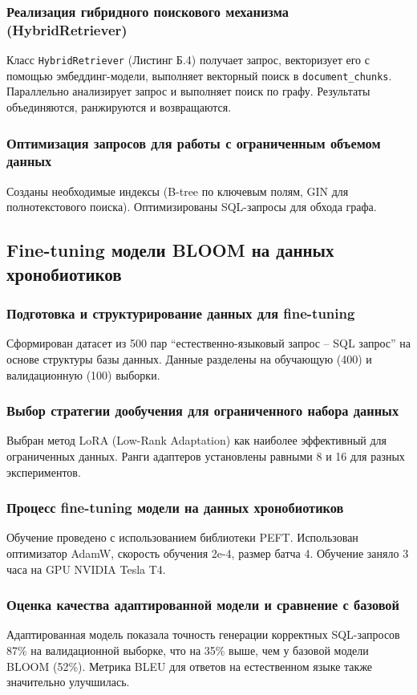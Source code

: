 \documentclass[a4paper,14pt]{extarticle}
\begin{document}
	\subsubsection{Реализация гибридного поискового механизма (HybridRetriever)}
	Класс \texttt{HybridRetriever} (Листинг Б.4) получает запрос, векторизует его с помощью эмбеддинг-модели, выполняет векторный поиск в \texttt{document\_chunks}. Параллельно анализирует запрос и выполняет поиск по графу. Результаты объединяются, ранжируются и возвращаются.
	
	\subsubsection{Оптимизация запросов для работы с ограниченным объемом данных}
	Созданы необходимые индексы (B-tree по ключевым полям, GIN для полнотекстового поиска). Оптимизированы SQL-запросы для обхода графа.
	
	\subsection{Fine-tuning модели BLOOM на данных хронобиотиков}
	
	\subsubsection{Подготовка и структурирование данных для fine-tuning}
	Сформирован датасет из 500 пар ``естественно-языковый запрос – SQL запрос'' на основе структуры базы данных. Данные разделены на обучающую (400) и валидационную (100) выборки.
	
	\subsubsection{Выбор стратегии дообучения для ограниченного набора данных}
	Выбран метод LoRA (Low-Rank Adaptation) как наиболее эффективный для ограниченных данных. Ранги адаптеров установлены равными 8 и 16 для разных экспериментов.
	
	\subsubsection{Процесс fine-tuning модели на данных хронобиотиков}
	Обучение проведено с использованием библиотеки PEFT. Использован оптимизатор AdamW, скорость обучения 2e-4, размер батча 4. Обучение заняло 3 часа на GPU NVIDIA Tesla T4.
	
	\subsubsection{Оценка качества адаптированной модели и сравнение с базовой}
	Адаптированная модель показала точность генерации корректных SQL-запросов 87\% на валидационной выборке, что на 35\% выше, чем у базовой модели BLOOM (52\%). Метрика BLEU для ответов на естественном языке также значительно улучшилась.
	
\end{document}
